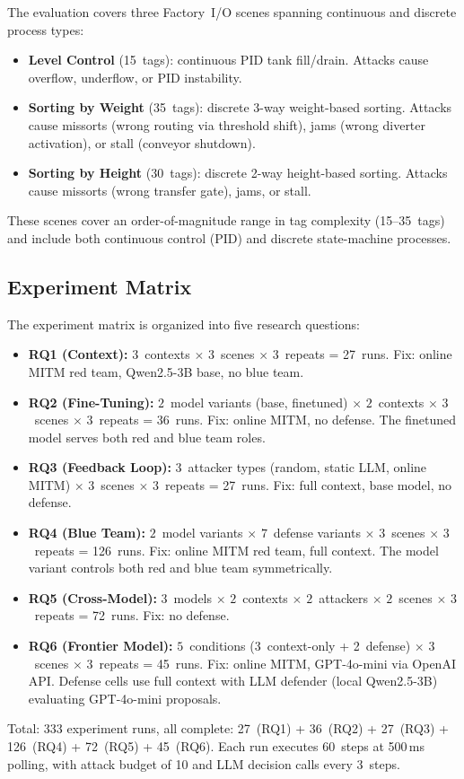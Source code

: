 The evaluation covers three Factory~I/O scenes spanning continuous and discrete process types:
\begin{itemize}[leftmargin=1.2em,nosep]
    \item \textbf{Level Control} (15~tags): continuous PID tank fill/drain. Attacks cause overflow, underflow, or PID instability.
    \item \textbf{Sorting by Weight} (35~tags): discrete 3-way weight-based sorting. Attacks cause missorts (wrong routing via threshold shift), jams (wrong diverter activation), or stall (conveyor shutdown).
    \item \textbf{Sorting by Height} (30~tags): discrete 2-way height-based sorting. Attacks cause missorts (wrong transfer gate), jams, or stall.
\end{itemize}

These scenes cover an order-of-magnitude range in tag complexity (15--35~tags) and include both continuous control (PID) and discrete state-machine processes.

\subsection{Experiment Matrix}

The experiment matrix is organized into five research questions:
\begin{itemize}[leftmargin=1.2em]
    \item \textbf{RQ1 (Context):} $3$~contexts $\times$ $3$~scenes $\times$ $3$~repeats = 27~runs. Fix: online MITM red team, Qwen2.5-3B base, no blue team.
    \item \textbf{RQ2 (Fine-Tuning):} $2$~model variants (base, finetuned) $\times$ $2$~contexts $\times$ $3$~scenes $\times$ $3$~repeats = 36~runs. Fix: online MITM, no defense. The finetuned model serves both red and blue team roles.
    \item \textbf{RQ3 (Feedback Loop):} $3$~attacker types (random, static LLM, online MITM) $\times$ $3$~scenes $\times$ $3$~repeats = 27~runs. Fix: full context, base model, no defense.
    \item \textbf{RQ4 (Blue Team):} $2$~model variants $\times$ $7$~defense variants $\times$ $3$~scenes $\times$ $3$~repeats = 126~runs. Fix: online MITM red team, full context. The model variant controls both red and blue team symmetrically.
    \item \textbf{RQ5 (Cross-Model):} $3$~models $\times$ $2$~contexts $\times$ $2$~attackers $\times$ $2$~scenes $\times$ $3$~repeats = 72~runs. Fix: no defense.
    \item \textbf{RQ6 (Frontier Model):} $5$~conditions (3~context-only + 2~defense) $\times$ $3$~scenes $\times$ $3$~repeats = 45~runs. Fix: online MITM, GPT-4o-mini via OpenAI API. Defense cells use full context with LLM defender (local Qwen2.5-3B) evaluating GPT-4o-mini proposals.
\end{itemize}
Total: 333 experiment runs, all complete: 27~(RQ1) + 36~(RQ2) + 27~(RQ3) + 126~(RQ4) + 72~(RQ5) + 45~(RQ6). Each run executes 60~steps at 500\,ms polling, with attack budget of 10 and LLM decision calls every 3~steps.

